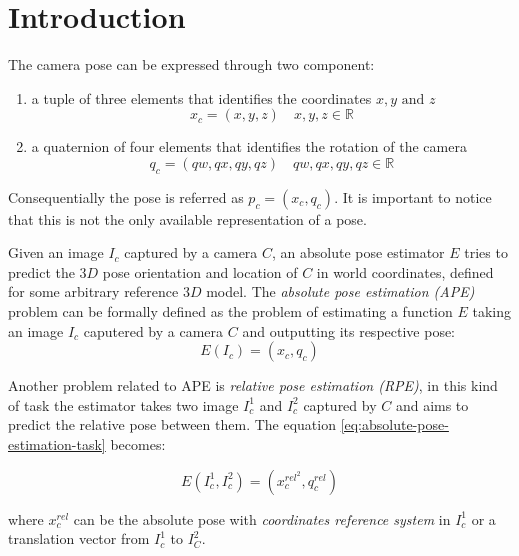 \section{Introduction}
The camera pose can be expressed through two component:
\begin{enumerate}
    \item a tuple of three elements that identifies the coordinates $x,y\text{ and }z$
    \begin{equation}
        x_c=(x,y,z)\quad x,y,z \in \mathbb{R}  
        \label{eq:absolute-position-definition}
    \end{equation}
    \item a quaternion of four elements that identifies the rotation of the camera
    \begin{equation}
        q_c=(qw, qx, qy, qz)\quad qw,qx,qy,qz \in \mathbb{R}
        \label{eq:quaternion-as-rotation-definition}
    \end{equation}

\end{enumerate}
Consequentially the pose is referred as $p_c=(x_c, q_c)$. It is important to notice that this is not the only available representation of a pose.

Given an image $I_c$ captured by a camera $C$, an absolute pose estimator $E$ tries to predict the $3D$ pose orientation and location of $C$ in world coordinates, defined for some arbitrary reference $3D$ model. The \textit{absolute pose estimation (APE)} problem can be formally defined as the problem of estimating a function $E$ taking an image $I_c$ caputered by a camera $C$ and outputting its respective pose:
\begin{equation}
    E(I_c) = (x_c, q_c)
    \label{eq:absolute-pose-estimation-task}
\end{equation}

Another problem related to APE is \textit{relative pose estimation (RPE)}, in this kind of task the estimator takes two image $I_c^1$ and $I_c^2$ captured by $C$ and aims to predict the relative pose between them. The equation \ref{eq:absolute-pose-estimation-task} becomes:

\begin{equation}
    E(I_c^1, I_c^2) = (x_c^{rel^2}, q_c^{rel})
    \label{eq:relative-pose-estimation-task}
\end{equation}

where $x_c^{rel}$ can be the absolute pose with \textit{coordinates reference system} in $I_c^1$ or a translation vector from $I_c^1$ to $I_C^2$.
